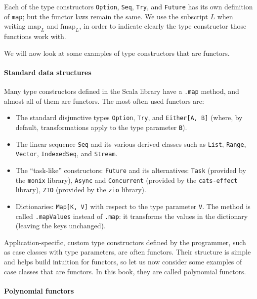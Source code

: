 Each of the type constructors \lstinline!Option!, \lstinline!Seq!,
\lstinline!Try!, and \lstinline!Future! has its own definition of
\lstinline!map!; but the functor laws remain the same. We use the
subscript $L$ when writing $\text{map}_{L}$ and $\text{fmap}_{L}$,
in order to indicate clearly the type constructor those functions
work with.

We will now look at some examples of type constructors that are functors.

\paragraph{Standard data structures}

Many type constructors defined in the Scala library have a \lstinline!.map!
method, and almost all of them are functors. The most often used functors
are:
\begin{itemize}
\item The standard disjunctive types \lstinline!Option!, \lstinline!Try!,
and \lstinline!Either[A, B]! (where, by default, transformations
apply to the type parameter \lstinline!B!).
\item The linear sequence \lstinline!Seq! and its various derived classes
such as \lstinline!List!, \lstinline!Range!, \lstinline!Vector!,
\lstinline!IndexedSeq!, and \lstinline!Stream!.
\item The ``task-like'' constructors: \lstinline!Future! and its alternatives:
\lstinline!Task! (provided by the \texttt{monix} library), \lstinline!Async!
and \lstinline!Concurrent! (provided by the \texttt{cats-effect}
library), \lstinline!ZIO! (provided by the \texttt{zio} library).
\item Dictionaries: \lstinline!Map[K, V]! with respect to the type parameter
\lstinline!V!. The method is called \lstinline!.mapValues! instead
of \lstinline!.map!: it transforms the values in the dictionary (leaving
the keys unchanged).
\end{itemize}
Application-specific, custom type constructors defined by the programmer,
such as case classes with type parameters, are often functors. Their
structure is simple and helps build intuition for functors, so let
us now consider some examples of case classes that are functors. In
this book, they are called polynomial functors.

\paragraph{Polynomial functors}

